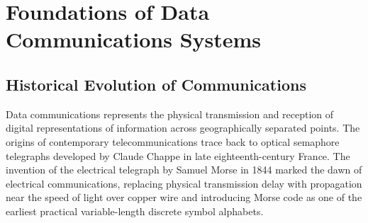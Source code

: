 \documentclass[10pt,twocolumn]{article}
\begin{document}
\begin{abstract}
\noindent We present \textbf{commsim-studio}, a modern C++17 digital communication simulation and interactive visualization engine engineered for high-performance laboratory instruction and research. The system addresses two persistent challenges in communication engineering pedagogy: the computational latency of traditional interpreted simulation environments and the lack of real-time intuition regarding dynamic physical-layer phenomena. \textit{commsim-studio} features a wait-free multi-threaded pipeline coupling a deterministic DSP graph to an OpenGL 3.3 GPU phosphor density renderer capable of accumulating 1,000,000 points/second at 60 frames/second. We demonstrate bit-identical reproducible results across varying thread counts via a counter-based PCG pseudo-random number generator keyed by $(\text{seed}, \text{block\_id}, \text{sample\_index})$. Across comprehensive testing with 59 tests, we empirically validate all theoretical benchmarks: Nyquist pulse shaping (zero ISI error $< 3.6 \times 10^{-5}$), Soft Viterbi $K=7$ coding gain ($> 5.3\text{ dB}$ at $\text{BER}=10^{-5}$), Shannon capacity boundaries, Carson's rule bandwidth, orthogonal Walsh CDMA (zero multi-user interference across 12 simultaneous users), and Stop-and-Wait/Go-Back-N ARQ throughput efficiency (within $0.39\%$ of theory). The headless engine achieves $115.8\text{ Mbit/s}$ uncoded BPSK and $170.5\text{ Mbit/s}$ 16-QAM throughput on a single core, surpassing performance targets by up to $11.3\times$.
\end{abstract}

\section{Foundations of Data Communications Systems}

\subsection{Historical Evolution of Communications}
Data communications represents the physical transmission and reception of digital representations of information across geographically separated points. The origins of contemporary telecommunications trace back to optical semaphore telegraphs developed by Claude Chappe in late eighteenth-century France. The invention of the electrical telegraph by Samuel Morse in 1844 marked the dawn of electrical communications, replacing physical transmission delay with propagation near the speed of light over copper wire and introducing Morse code as one of the earliest practical variable-length discrete symbol alphabets.
\end{document}
